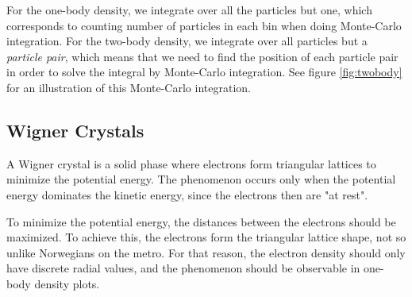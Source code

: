 For the one-body density, we integrate over all the particles but one, which corresponds to counting number of particles in each bin when doing Monte-Carlo integration. For the two-body density, we integrate over all particles but a \textit{particle pair}, which means that we need to find the position of each particle pair in order to solve the integral by Monte-Carlo integration. See figure \eqref{fig:twobody} for an illustration of this Monte-Carlo integration.

\subsection{Wigner Crystals} \label{sec:wigner}
A Wigner crystal is a solid phase where electrons form triangular lattices to minimize the potential energy. The phenomenon occurs only when the potential energy dominates the kinetic energy, since the electrons then are "at rest". 

To minimize the potential energy, the distances between the electrons should be maximized. To achieve this, the electrons form the triangular lattice shape, not so unlike Norwegians on the metro. For that reason, the electron density should only have discrete radial values, and the phenomenon should be observable in one-body density plots.



